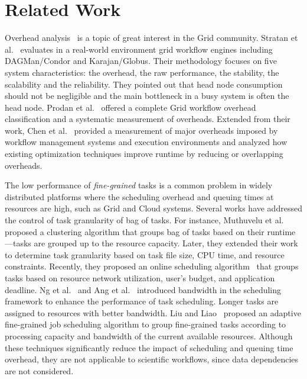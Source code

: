 \section{Related Work}
\label{sec:related-work}

Overhead analysis~\cite{Ostberg2011, Prodan2008} is a topic of great interest in the Grid community. Stratan et al.~\cite{Stratan2008} evaluates in a real-world environment grid workflow engines including DAGMan/Condor and Karajan/Globus. Their methodology focuses on five system characteristics: the overhead, the raw performance, the stability, the scalability and the reliability. They pointed out that head node consumption should not be negligible and the main bottleneck in a busy system is often the head node. Prodan et al.~\cite{Prodan2008} offered a complete Grid workflow overhead classification and a systematic measurement of overheads. Extended from their work, Chen et al.~\cite{Chen2011} provided a measurement of major overheads imposed by workflow management systems and execution environments and analyzed how existing optimization techniques improve runtime by reducing or overlapping overheads. 

The low performance of \emph{fine-grained} tasks is a common problem in widely distributed platforms where the scheduling overhead and queuing times at resources are high, such as Grid and Cloud systems. Several works have addressed the control of task granularity of bag of tasks. For instance, Muthuvelu et al.~\cite{Muthuvelu:2005:DJG:1082290.1082297} proposed a clustering algorithm that groups bag of tasks based on their runtime---tasks are grouped up to the resource capacity. Later, they extended their work~\cite{4493929} to determine task granularity based on task file size, CPU time, and resource constraints. Recently, they proposed an online scheduling algorithm~\cite{Muthuvelu2010,Muthuvelu2013170} that groups tasks based on resource network utilization, user's budget, and application deadline. Ng et al.~\cite{keat-2006} and Ang et al.~\cite{ang-2009} introduced bandwidth in the scheduling framework to enhance the performance of task scheduling. Longer tasks are assigned to resources with better bandwidth. Liu and Liao~\cite{Liu2009} proposed an adaptive fine-grained job scheduling algorithm to group fine-grained tasks according to processing capacity and bandwidth of the current available resources. Although these techniques significantly reduce the impact of scheduling and queuing time overhead, they are not applicable to scientific workflows, since data dependencies are not considered.

